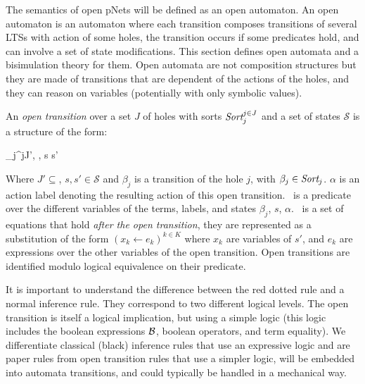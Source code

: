 \documentclass{lncs/llncs}
\newcommand{\TODO}[1]{\textcolor{red}{\textbf{[TODO:#1]}}}
\begin{document}
The semantics of open pNets will be defined  as an open automaton. An open
automaton is an automaton where each transition composes transitions of several LTSs with
action of some holes, the transition occurs if some predicates hold, and can involve a 
set of state modifications. This section defines open automata and a bisimulation theory for them. Open automata are not composition structures but they are made of transitions that are dependent of the actions of the holes, and they can reason on variables (potentially with only symbolic values).
\begin{definition}\label{def:OT}
	\label{def:OpenTransitions}
	An \emph{open transition} over a
	set $J$ of holes with sorts $\Sort_j^{j\in J}$ and a set of states $\mathcal{S}$ is 
	a structure of the form:	
	\begin{mathpar}
	\openrule
	{	\beta_j^{j\in J'}, \Pred, \Post}
	{s \OTarrow {\alpha}s'}
	\end{mathpar}
	Where $J'\subseteq$, $s, s'\in\mathcal{S}$ and $\beta_j$
        is a transition of the hole $j$, with $\beta_j\in\Sort_j$. $\alpha$ is an action 
        label denoting the resulting action
        of this open transition. \Pred\ is a predicate 
	over the different variables of the
	terms, labels, and states $\beta_j$, $s$, $\alpha$. \Post\ is a set of 
	equations 
	that 
	hold \emph{after the open transition}, they are represented as a substitution of the 
	form $({x_k\gets e_k})^{k\in K}$ 
	where $x_k$ are variables of $s'$, and $e_k$ are expressions over the other 
	variables of the open transition. Open transitions are identified modulo logical equivalence on their predicate.
\end{definition}

It is important to understand the difference between the red dotted rule and a normal 
inference rule. They correspond to two different logical levels.
 The open transition is itself a logical implication, but using a simple logic (this logic includes the boolean expressions $\mathcal{B}$, boolean operators, and term equality). We differentiate classical (black) inference rules that use 
 an expressive logic and are paper rules from open transition rules that use a simpler 
 logic, 
 will be embedded into automata transitions, and could typically be handled in a 
 mechanical way.
\end{document}
